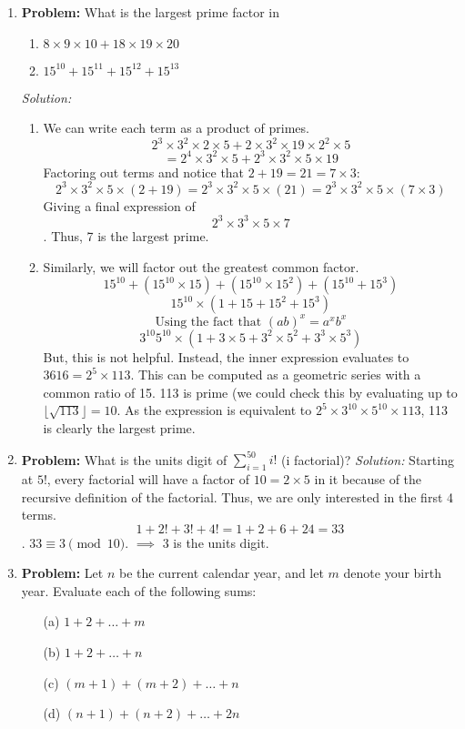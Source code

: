 \documentclass{article}
\begin{document}
\begin{enumerate}
    \item \textbf{Problem:}
    What is the largest prime factor in 
    \begin{enumerate}
        \item $8\times9\times10 + 18\times19\times20$
        \item $15^{10}+15^{11}+15^{12}+15^{13}$
    \end{enumerate}
    \textit{Solution:}
    \begin{enumerate}
        \item We can write each term as a product of primes. $$2^{3}\times3^{2}\times2\times5 + 2\times3^{2}\times19\times2^{2}\times5$$  $$= 2^{4}\times3^{2}\times5 + 2^{3}\times3^{2}\times5\times19$$
        Factoring out terms and notice that $2+19 = 21 = 7\times3$:
        $$2^{3}\times3^{2}\times5\times(2+19) = 
        2^{3}\times3^{2}\times5\times(21) = 
        2^{3}\times3^{2}\times5\times(7\times3)$$
        Giving a final expression of $$2^{3}\times3^{3}\times{5}\times{7}$$.
        Thus, 7 is the largest prime.
        \item Similarly, we will factor out the greatest common factor.
        $$15^{10} +(15^{10}\times15)+(15^{10}\times15^{2})+(15^{10}+15^{3})$$
        $$15^{10}\times(1+15+15^{2}+15^{3})$$
        $$\text{Using the fact that }(ab)^x = a^xb^x$$
        $$3^{10}5^{10}\times(1+3\times5+3^2\times5^2+3^3\times5^3)$$
        But, this is not helpful.
        Instead, the inner expression evaluates to $3616 = 2^5\times113$. This can be computed as a geometric series with a common ratio of 15.
        113 is prime (we could check this by evaluating up to $\lfloor{\sqrt{113}}\rfloor = 10$. 
        As the expression is equivalent to $2^{5}\times3^{10}\times5^{10}\times113$, 113 is clearly the largest prime.
    \end{enumerate}
    \item \textbf{Problem:}
    What is the units digit of $\sum_{i=1}^{50} i!  $ (i factorial)?
    \textit{Solution:} Starting at $5!$, every factorial will have a factor of $10 = 2\times5$ in it because of the recursive definition of the factorial. Thus, we are only interested in the first 4 terms. $$1+2!+3!+4! = 1+2+6+24 = 33$$. 
    $33 \equiv 3 \pmod{10}.$
    $\implies$ 3 is the units digit.
    \item \textbf{Problem:} Let \( n \) be the current calendar year, and let \( m \) denote your birth year. Evaluate each of the following sums:

    \begin{enumerate}
        \item[(a)] \( 1 + 2 + \ldots + m \)
        \item[(b)] \( 1 + 2 + \ldots + n \)
        \item[(c)] \( (m+1) + (m+2) + \ldots + n \)
        \item[(d)] \( (n+1) + (n+2) + \ldots + 2n \)
    \end{enumerate}


\end{enumerate}
\end{document}
